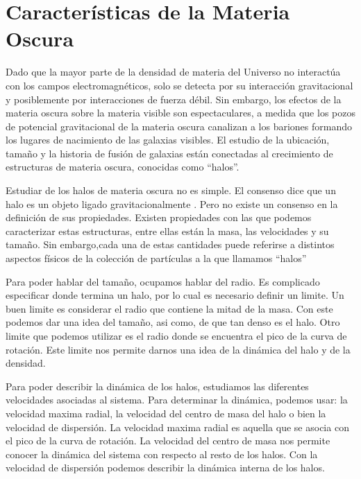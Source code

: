 \section{Características de la Materia Oscura}

Dado que la mayor parte de la densidad de materia del Universo no interactúa con los campos electromagnéticos, solo se detecta por su interacción gravitacional y posiblemente por interacciones de fuerza débil. Sin embargo, los efectos de la materia oscura sobre la materia visible son espectaculares, a medida que los pozos de potencial gravitacional de la materia oscura canalizan a los bariones formando los lugares de nacimiento de las galaxias visibles. El estudio de la ubicación, tamaño y la historia de fusión de galaxias están conectadas al crecimiento de estructuras de materia oscura, conocidas como ``halos''.

Estudiar de los halos de materia oscura no es simple.  El consenso dice que un halo es un objeto ligado gravitacionalmente \cite{2011MNRAS.415.2293K}. Pero no existe un consenso en la definición de sus propiedades. Existen propiedades con las que podemos caracterizar estas estructuras, entre ellas están la masa, las velocidades y su tamaño. Sin embargo,cada una de estas cantidades puede referirse a distintos aspectos físicos de la colección de partículas a la que llamamos ``halos''

Para poder hablar del tamaño, ocupamos hablar del radio. Es complicado especificar donde termina un halo, por lo cual es necesario definir un limite. Un buen limite es considerar el radio que contiene la mitad de la masa. Con este podemos dar una idea del tamaño, asi como, de que tan denso es el halo. Otro limite que podemos utilizar es el radio donde se encuentra el pico de la curva de rotación. Este limite nos permite darnos una idea de la dinámica del halo y de la densidad.

Para poder describir la dinámica de los halos, estudiamos las diferentes velocidades asociadas al sistema. Para determinar la dinámica, podemos usar: la velocidad maxima radial, la velocidad del centro de masa del halo o bien la velocidad de dispersión. La velocidad maxima radial es aquella que se asocia con el pico de la curva de rotación. La velocidad del centro de masa nos permite conocer la dinámica del sistema con respecto al resto de los halos. Con la velocidad de dispersión podemos describir la dinámica interna de los halos. 


